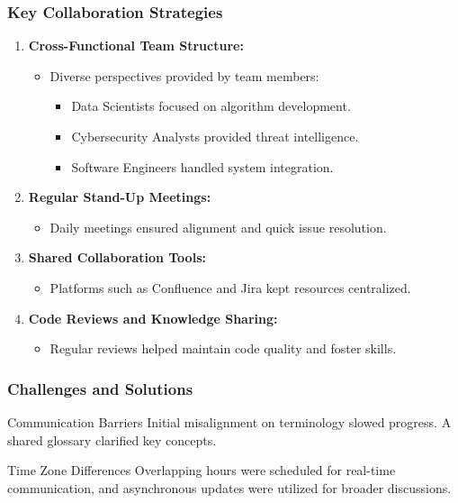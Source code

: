 \documentclass[aspectratio=169]{beamer}
\begin{document}
\begin{frame}[fragile]
    \frametitle{Key Collaboration Strategies}
    \begin{enumerate}
        \item \textbf{Cross-Functional Team Structure:}
            \begin{itemize}
                \item Diverse perspectives provided by team members:
                \begin{itemize}
                    \item Data Scientists focused on algorithm development.
                    \item Cybersecurity Analysts provided threat intelligence.
                    \item Software Engineers handled system integration.
                \end{itemize}
            \end{itemize}

        \item \textbf{Regular Stand-Up Meetings:}
            \begin{itemize}
                \item Daily meetings ensured alignment and quick issue resolution.
            \end{itemize}

        \item \textbf{Shared Collaboration Tools:}
            \begin{itemize}
                \item Platforms such as Confluence and Jira kept resources centralized.
            \end{itemize}

        \item \textbf{Code Reviews and Knowledge Sharing:}
            \begin{itemize}
                \item Regular reviews helped maintain code quality and foster skills.
            \end{itemize}
    \end{enumerate}
\end{frame}

\begin{frame}[fragile]
    \frametitle{Challenges and Solutions}
    \begin{block}{Communication Barriers}
        Initial misalignment on terminology slowed progress. A shared glossary clarified key concepts.
    \end{block}

    \begin{block}{Time Zone Differences}
        Overlapping hours were scheduled for real-time communication, and asynchronous updates were utilized for broader discussions.
    \end{block}
\end{frame}
\end{document}
